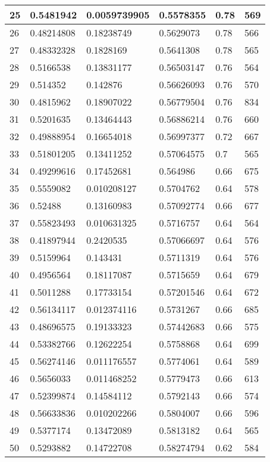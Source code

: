\begin{longtable}{|l|l|l|l|l|l|}
25 & 0.5481942 & 0.0059739905 & 0.5578355 & 0.78 & 569 \\ \hline 
26 & 0.48214808 & 0.18238749 & 0.5629073 & 0.78 & 566 \\ \hline 
27 & 0.48332328 & 0.1828169 & 0.5641308 & 0.78 & 565 \\ \hline 
28 & 0.5166538 & 0.13831177 & 0.56503147 & 0.76 & 564 \\ \hline 
29 & 0.514352 & 0.142876 & 0.56626093 & 0.76 & 570 \\ \hline 
30 & 0.4815962 & 0.18907022 & 0.56779504 & 0.76 & 834 \\ \hline 
31 & 0.5201635 & 0.13464443 & 0.56886214 & 0.76 & 660 \\ \hline 
32 & 0.49888954 & 0.16654018 & 0.56997377 & 0.72 & 667 \\ \hline 
33 & 0.51801205 & 0.13411252 & 0.57064575 & 0.7 & 565 \\ \hline 
34 & 0.49299616 & 0.17452681 & 0.564986 & 0.66 & 675 \\ \hline 
35 & 0.5559082 & 0.010208127 & 0.5704762 & 0.64 & 578 \\ \hline 
36 & 0.52488 & 0.13160983 & 0.57092774 & 0.66 & 677 \\ \hline 
37 & 0.55823493 & 0.010631325 & 0.5716757 & 0.64 & 564 \\ \hline 
38 & 0.41897944 & 0.2420535 & 0.57066697 & 0.64 & 576 \\ \hline 
39 & 0.5159964 & 0.143431 & 0.5711319 & 0.64 & 576 \\ \hline 
40 & 0.4956564 & 0.18117087 & 0.5715659 & 0.64 & 679 \\ \hline 
41 & 0.5011288 & 0.17733154 & 0.57201546 & 0.64 & 672 \\ \hline 
42 & 0.56134117 & 0.012374116 & 0.5731267 & 0.66 & 685 \\ \hline 
43 & 0.48696575 & 0.19133323 & 0.57442683 & 0.66 & 575 \\ \hline 
44 & 0.53382766 & 0.12622254 & 0.5758868 & 0.64 & 699 \\ \hline 
45 & 0.56274146 & 0.011176557 & 0.5774061 & 0.64 & 589 \\ \hline 
46 & 0.5656033 & 0.011468252 & 0.5779473 & 0.66 & 613 \\ \hline 
47 & 0.52399874 & 0.14584112 & 0.5792143 & 0.66 & 574 \\ \hline 
48 & 0.56633836 & 0.010202266 & 0.5804007 & 0.66 & 596 \\ \hline 
49 & 0.5377174 & 0.13472089 & 0.5813182 & 0.64 & 565 \\ \hline 
50 & 0.5293882 & 0.14722708 & 0.58274794 & 0.62 & 584 \\ \hline 
\end{longtable}